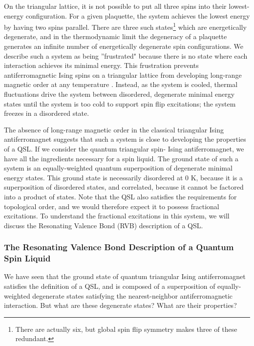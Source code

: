 On the triangular lattice, it is not possible to put all three spins into their lowest-energy configuration. For a given plaquette, the system achieves the lowest energy by having two spins parallel. There are three such states\footnote{There are actually six, but global spin flip symmetry makes three of these redundant.} which are energetically degenerate, and in the thermodynamic limit the degeneracy of a plaquette generates an infinite number of energetically degenerate spin configurations. We describe such a system as being ''frustrated" because there is no state where each interaction achieves its minimal energy. This frustration prevents antiferromagnetic Ising spins on a triangular lattice from developing long-range magnetic order at any temperature \cite{Wannier1950}. Instead, as the system is cooled, thermal fluctuations drive the system between disordered, degenerate minimal energy states until the system is too cold to support spin flip excitations; the system freezes in a disordered state.

The absence of long-range magnetic order in the classical triangular Ising antiferromagnet suggests that such a system is close to developing the properties of a QSL. If we consider the quantum triangular spin-\textonehalf{} Ising antiferromagnet, we have all the ingredients necessary for a spin liquid. The ground state of such a system is an equally-weighted quantum superposition of degenerate minimal energy states. This ground state is necessarily disordered at 0 K, because it is a superposition of disordered states, and correlated, because it cannot be factored into a product of states. Note that the QSL also satisfies the requirements for topological order, and we would therefore expect it to possess fractional excitations. To understand the fractional excitations in this system, we will discuss the Resonating Valence Bond (RVB) description of a QSL.


\subsubsection{The Resonating Valence Bond Description of a Quantum Spin Liquid}

We have seen that the ground state of quantum triangular Ising antiferromagnet satisfies the definition of a QSL, and is composed of a superposition of equally-weighted degenerate states satisfying the nearest-neighbor antiferromagnetic interaction. But what are these degenerate states? What are their properties?

